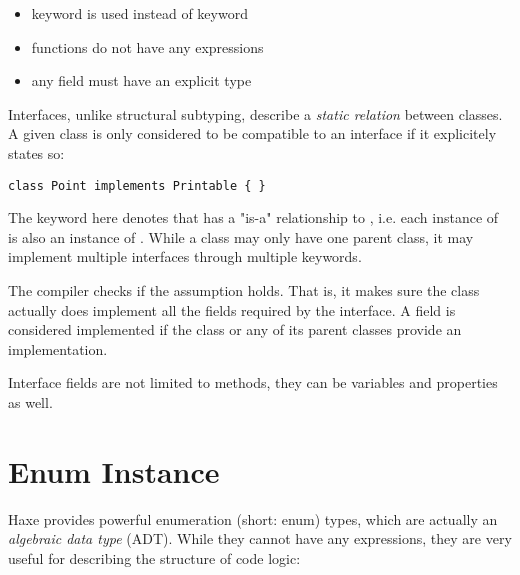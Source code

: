 \documentclass{haxe}
\begin{document}
\begin{itemize}
	\item {} keyword is used instead of  keyword
	\item functions do not have any expressions
	\item any field must have an explicit type
\end{itemize}
Interfaces, unlike structural subtyping, describe a \emph{static relation} between classes. A given class is only considered to be compatible to an interface if it explicitely states so:

\begin{lstlisting}
class Point implements Printable { }
\end{lstlisting}
The  keyword here denotes that  has a "is-a" relationship to , i.e. each instance of  is also an instance of . While a class may only have one parent class, it may implement multiple interfaces through multiple  keywords.

The compiler checks if the  assumption holds. That is, it makes sure the class actually does implement all the fields required by the interface. A field is considered implemented if the class or any of its parent classes provide an implementation.

Interface fields are not limited to methods, they can be variables and properties as well.



\section{Enum Instance}
\label{types-enum-instance}

Haxe provides powerful enumeration (short: enum) types, which are actually an \emph{algebraic data type} (ADT). While they cannot have any expressions, they are very useful for describing the structure of code logic:
\end{document}
